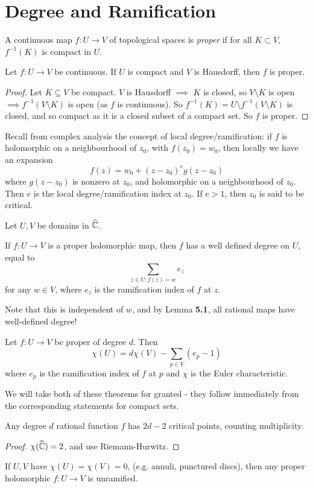 \documentclass[10pt,a4paper]{article}
\begin{document}
\section{Degree and Ramification}
\begin{definition}
  A continuous map $f:U \to V$ of topological spaces is \emph{proper} if for all $K \subset V$, $f^{-1}(K)$ is compact in $U$.
\end{definition}
\addtocounter{theorem}{-1}
\begin{lemma}
  Let $f:U\to V$ be continuous. If $U$ is compact and $V$ is Hausdorff, then $f$ is proper.
\end{lemma}
\begin{proof}
  Let $K \subseteq V$ be compact. $V$ is Hausdorff $\implies$ $K$ is closed, so $V \setminus K$ is open $\implies f^{-1}(V\setminus K)$ is open (as $f$ is continuous). So $f^{-1}(K) = U \setminus f^{-1}(V\setminus K)$ is closed, and so compact as it is a closed subset of a compact set. So $f$ is proper.
\end{proof}

Recall from complex analysis the concept of local degree/ramification: if $f$ is holomorphic on a neighbourhood of $z_0$, with $f(z_0) = w_0$, then locally we have an expansion\[f(z) = w_0 + (z-z_0)^eg(z-z_0)\] where $g(z-z_0)$ is nonzero at $z_0$, and holomorphic on a neighbourhood of $z_0$. Then $e$ is the local degree/ramification index at $z_0$. If $e > 1$, then $z_0$ is said to be critical.

Let $U, V$ be domains in $\widehat{\mathbb{C}}$.
\addtocounter{theorem}{-1}
\begin{proposition}
  If $f:U \to V$ is a proper holomorphic map, then $f$ has a well defined degree on $U$, equal to\[\sum_{z \in U: f(z) = w} e_z\] for any $w \in V$, where $e_z$ is the ramification index of $f$ at $z$.
\end{proposition}
Note that this is independent of $w$, and by Lemma \textbf{5.1}, all rational maps have well-defined degree!
\addtocounter{theorem}{-1}
\begin{theorem}
  Let $f:U \to V$ be proper of degree $d$. Then\[\chi(U) = d\chi(V) - \sum_{p\in V}(e_p-1)\] where $e_p$ is the ramification index of $f$ at $p$ and $\chi$ is the Euler characteristic.
\end{theorem}
We will take both of these theorems for granted - they follow immediately from the corresponding statements for compact sets.

\begin{corollary}
  Any degree $d$ rational function $f$ has $2d-2$ critical points, counting multiplicity.
\end{corollary}
\begin{proof}
  $\chi(\widehat{\mathbb{C}}) = 2$, and use Riemann-Hurwitz.
\end{proof}
\begin{corollary}
  If $U, V$ have $\chi(U) = \chi(V) = 0$, (e.g. annuli, punctured discs), then any proper holomorphic $f:U \to V$ is unramified.
\end{corollary}
\end{document}

